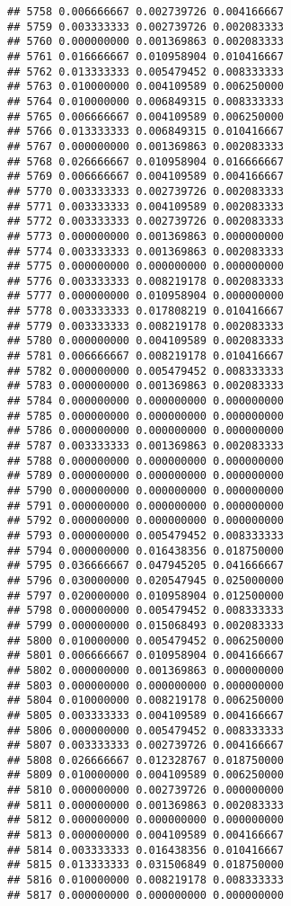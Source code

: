 \documentclass[
]{article}
\begin{document}
\begin{verbatim}
## 5758 0.006666667 0.002739726 0.004166667
## 5759 0.003333333 0.002739726 0.002083333
## 5760 0.000000000 0.001369863 0.002083333
## 5761 0.016666667 0.010958904 0.010416667
## 5762 0.013333333 0.005479452 0.008333333
## 5763 0.010000000 0.004109589 0.006250000
## 5764 0.010000000 0.006849315 0.008333333
## 5765 0.006666667 0.004109589 0.006250000
## 5766 0.013333333 0.006849315 0.010416667
## 5767 0.000000000 0.001369863 0.002083333
## 5768 0.026666667 0.010958904 0.016666667
## 5769 0.006666667 0.004109589 0.004166667
## 5770 0.003333333 0.002739726 0.002083333
## 5771 0.003333333 0.004109589 0.002083333
## 5772 0.003333333 0.002739726 0.002083333
## 5773 0.000000000 0.001369863 0.000000000
## 5774 0.003333333 0.001369863 0.002083333
## 5775 0.000000000 0.000000000 0.000000000
## 5776 0.003333333 0.008219178 0.002083333
## 5777 0.000000000 0.010958904 0.000000000
## 5778 0.003333333 0.017808219 0.010416667
## 5779 0.003333333 0.008219178 0.002083333
## 5780 0.000000000 0.004109589 0.002083333
## 5781 0.006666667 0.008219178 0.010416667
## 5782 0.000000000 0.005479452 0.008333333
## 5783 0.000000000 0.001369863 0.002083333
## 5784 0.000000000 0.000000000 0.000000000
## 5785 0.000000000 0.000000000 0.000000000
## 5786 0.000000000 0.000000000 0.000000000
## 5787 0.003333333 0.001369863 0.002083333
## 5788 0.000000000 0.000000000 0.000000000
## 5789 0.000000000 0.000000000 0.000000000
## 5790 0.000000000 0.000000000 0.000000000
## 5791 0.000000000 0.000000000 0.000000000
## 5792 0.000000000 0.000000000 0.000000000
## 5793 0.000000000 0.005479452 0.008333333
## 5794 0.000000000 0.016438356 0.018750000
## 5795 0.036666667 0.047945205 0.041666667
## 5796 0.030000000 0.020547945 0.025000000
## 5797 0.020000000 0.010958904 0.012500000
## 5798 0.000000000 0.005479452 0.008333333
## 5799 0.000000000 0.015068493 0.002083333
## 5800 0.010000000 0.005479452 0.006250000
## 5801 0.006666667 0.010958904 0.004166667
## 5802 0.000000000 0.001369863 0.000000000
## 5803 0.000000000 0.000000000 0.000000000
## 5804 0.010000000 0.008219178 0.006250000
## 5805 0.003333333 0.004109589 0.004166667
## 5806 0.000000000 0.005479452 0.008333333
## 5807 0.003333333 0.002739726 0.004166667
## 5808 0.026666667 0.012328767 0.018750000
## 5809 0.010000000 0.004109589 0.006250000
## 5810 0.000000000 0.002739726 0.000000000
## 5811 0.000000000 0.001369863 0.002083333
## 5812 0.000000000 0.000000000 0.000000000
## 5813 0.000000000 0.004109589 0.004166667
## 5814 0.003333333 0.016438356 0.010416667
## 5815 0.013333333 0.031506849 0.018750000
## 5816 0.010000000 0.008219178 0.008333333
## 5817 0.000000000 0.000000000 0.000000000

\end{verbatim}
\end{document}
